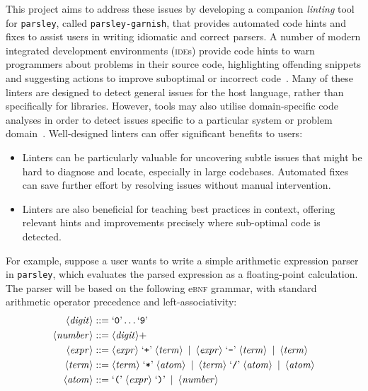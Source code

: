 \documentclass[../../main.tex]{subfiles}
\begin{document}
This project aims to address these issues by developing a companion \emph{linting} tool for \texttt{parsley}, called \texttt{parsley-garnish}, that provides automated code hints and fixes to assist users in writing idiomatic and correct parsers.
A number of modern integrated development environments (\textsc{ide}s) provide code hints to warn programmers about problems in their source code, highlighting offending snippets and suggesting actions to improve suboptimal or incorrect code~\cite{kurbatova_intellij_2021}.
Many of these linters are designed to detect general issues for the host language, rather than specifically for libraries.
However, tools may also utilise domain-specific code analyses in order to detect issues specific to a particular system or problem domain~\cite{renggli_domain-specific_2010,gregor_stllint_2006}.
Well-designed linters can offer significant benefits to users:
\begin{itemize}
  \item Linters can be particularly valuable for uncovering subtle issues that might be hard to diagnose and locate, especially in large codebases. Automated fixes can save further effort by resolving issues without manual intervention.
  \item Linters are also beneficial for teaching best practices in context, offering relevant hints and improvements precisely where sub-optimal code is detected.
\end{itemize}
%
For example, suppose a user wants to write a simple arithmetic expression parser in \texttt{parsley}, which evaluates the parsed expression as a floating-point calculation.
The parser will be based on the following e\textsc{bnf} grammar, with standard arithmetic operator precedence and left-associativity:
\begin{align*}
\langle \mathit{digit} \rangle &::= \text{`\texttt{0}'} \ldots \text{`\texttt{9}'} \\
\langle \mathit{number} \rangle &::= \langle \mathit{digit} \rangle+ \\
\langle \mathit{expr} \rangle &::= \langle \mathit{expr} \rangle \; \text{`\texttt{+}'} \; \langle \mathit{term} \rangle \enspace | \enspace
                                \langle \mathit{expr} \rangle \; \text{`\texttt{-}'} \; \langle \mathit{term} \rangle \enspace | \enspace
                                \langle \mathit{term} \rangle \\
\langle \mathit{term} \rangle &::= \langle \mathit{term} \rangle \; \text{`\texttt{*}'} \; \langle \mathit{atom} \rangle \enspace | \enspace
                                \langle \mathit{term} \rangle \; \text{`\texttt{/}'} \; \langle \mathit{atom} \rangle \enspace | \enspace
                                \langle \mathit{atom} \rangle \\
\langle \mathit{atom} \rangle &::= \text{`\texttt{(}'} \; \langle \mathit{expr} \rangle \; \text{`\texttt{)}'} \enspace | \enspace
                                \langle \mathit{number} \rangle
\end{align*}
\end{document}

